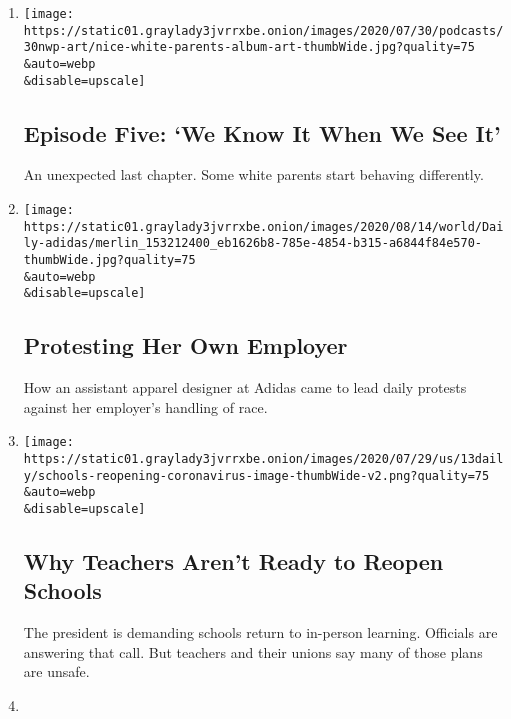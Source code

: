 \begin{enumerate}
\def\labelenumi{\arabic{enumi}.}
\item
  \href{/2020/08/20/podcasts/nice-white-parents-school.html}{}

  \texttt{[image: https://static01.graylady3jvrrxbe.onion/images/2020/07/30/podcasts/30nwp-art/nice-white-parents-album-art-thumbWide.jpg?quality=75\\\&auto=webp\\\&disable=upscale]}

  \hypertarget{episode-five-we-know-it-when-we-see-it}{%
  \subsection{Episode Five: `We Know It When We See
  It'}\label{episode-five-we-know-it-when-we-see-it}}

  An unexpected last chapter. Some white parents start behaving
  differently.
\item
  \href{/2020/08/14/podcasts/the-daily/protest-adidas-strike.html}{}

  \texttt{[image: https://static01.graylady3jvrrxbe.onion/images/2020/08/14/world/Daily-adidas/merlin\_153212400\_eb1626b8-785e-4854-b315-a6844f84e570-thumbWide.jpg?quality=75\\\&auto=webp\\\&disable=upscale]}

  \hypertarget{protesting-her-own-employer}{%
  \subsection{Protesting Her Own
  Employer}\label{protesting-her-own-employer}}

  How an assistant apparel designer at Adidas came to lead daily
  protests against her employer's handling of race.
\item
  \href{/2020/08/13/podcasts/the-daily/school-reopening.html}{}

  \texttt{[image: https://static01.graylady3jvrrxbe.onion/images/2020/07/29/us/13daily/schools-reopening-coronavirus-image-thumbWide-v2.png?quality=75\\\&auto=webp\\\&disable=upscale]}

  \hypertarget{why-teachers-arent-ready-to-reopen-schools}{%
  \subsection{Why Teachers Aren't Ready to Reopen
  Schools}\label{why-teachers-arent-ready-to-reopen-schools}}

  The president is demanding schools return to in-person learning.
  Officials are answering that call. But teachers and their unions say
  many of those plans are unsafe.
\item
  \href{/2020/08/13/podcasts/nice-white-parents-school.html}{}


\end{enumerate}
